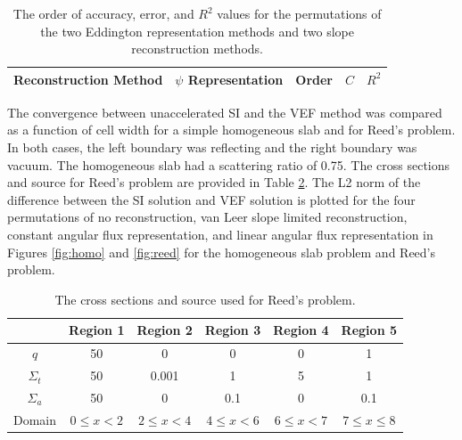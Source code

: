 	\begin{table} \centering
	\begin{tabular}{|c|c|c|c|c|}
	\hline
	\hline
	Reconstruction Method & $\psi$ Representation & Order & $C$ & $R^2$ \\ 
	\hline
		
	\hline
	\hline
	\end{tabular}
	\caption{The order of accuracy, error, and $R^2$ values for the permutations of the two Eddington representation methods and two slope reconstruction methods. }
	\label{tab:mms}
	\end{table}
	\afterpage{\clearpage}

The convergence between unaccelerated SI and the VEF method was compared as a function of cell width for a simple homogeneous slab and for Reed's problem. In both cases, the left boundary was reflecting and the right boundary was vacuum. The homogeneous slab had a scattering ratio of 0.75. The cross sections and source for Reed's problem are provided in Table \ref{tab:reedXS}. The L2 norm of the difference between the SI solution and VEF solution is plotted for the four permutations of no reconstruction, van Leer slope limited reconstruction, constant angular flux representation, and linear angular flux representation in Figures \ref{fig:homo} and \ref{fig:reed} for the homogeneous slab problem and Reed's problem. 

	\begin{table} \centering
		\begin{tabular}{|c|c|c|c|c|c|}
			\hline
			& Region 1 & Region 2 & Region 3 & Region 4 & Region 5 \\ 
			\hline 
			$q$ & 50 & 0 & 0 & 0 & 1 \\ 
			$\Sigma_t$ & 50 & 0.001 & 1 & 5 & 1 \\ 
			$\Sigma_a$ & 50 & 0 & 0.1 & 0 & 0.1 \\ 
			\hline 
			Domain & $0 \leq x < 2$ & $2 \leq x < 4$ & $4\leq x < 6$ &
				$6 \leq x < 7$ & $7 \leq x \leq 8$\\ 
			\hline 
		\end{tabular}
		\caption{The cross sections and source used for Reed's problem.}
		\label{tab:reedXS}
	\end{table}

